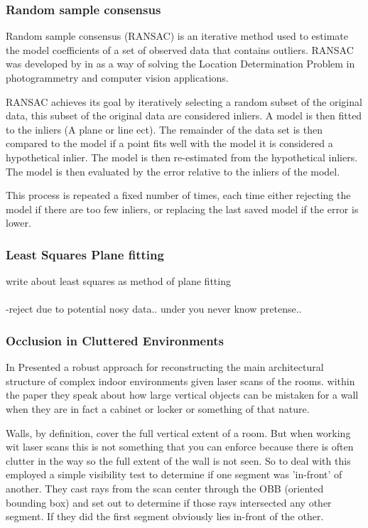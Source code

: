 	
		\subsubsection{Random sample consensus}
		Random sample consensus (RANSAC) is an iterative method used to estimate the model coefficients of a set of observed data that contains outliers. RANSAC was developed by \citeauthor{fischler_random_1981} in \citeyear{fischler_random_1981} as a way of solving the Location Determination Problem in photogrammetry and computer vision applications.
		
		RANSAC achieves its goal by iteratively selecting a random subset of the original data, this subset of the original data are considered inliers. A model is then fitted to the inliers (A plane or line ect). The remainder of the data set is then compared to the model if a point fits well with the model it is considered a hypothetical inlier. The model is then re-estimated from the hypothetical inliers. The model is then evaluated by the error relative to the inliers of the model.
		
		This process is repeated a fixed number of times, each time either rejecting the model if there are too few inliers, or replacing the last saved model if the error is lower.
		
		\subsubsection{Least Squares Plane fitting}
			write about least squares as method of plane fitting\\
			\\
			-reject due to potential nosy data.. under you never know pretense..
			
			\cite{arun_least_1987}
			
	
		\subsubsection{Occlusion in Cluttered Environments}
		In \citeyear{mura_automatic_2014} \citeauthor{mura_automatic_2014} Presented a robust approach for reconstructing the main architectural structure of complex indoor environments given laser scans of the rooms. within the paper they speak about how large vertical objects can be mistaken for a wall when they are in fact a cabinet or locker or something of that nature.
		
		Walls, by definition, cover the full vertical extent of a room. But when working wit laser scans this is not something that you can enforce because there is often clutter in the way so the full extent of the wall is not seen. So to deal with this \citeauthor{mura_automatic_2014} employed a simple visibility test to determine if one segment was 'in-front' of another. They cast rays from the scan center through the OBB (oriented bounding box) and set out to determine if those rays intersected any other segment. If they did the first segment obviously lies in-front of the other.
		
